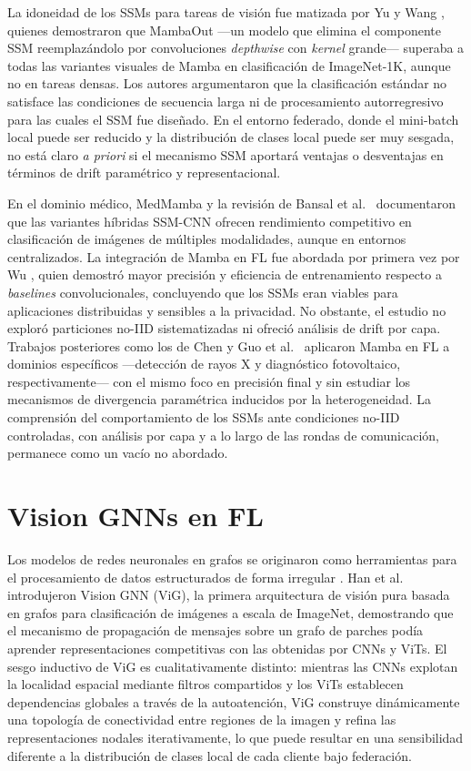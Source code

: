 La idoneidad de los SSMs para tareas de visión fue matizada por Yu y Wang \cite{yu2025mambaout},
quienes demostraron que MambaOut ---un modelo que elimina el componente SSM reemplazándolo por
convoluciones \textit{depthwise} con \textit{kernel} grande--- superaba a todas las variantes
visuales de Mamba en clasificación de ImageNet-1K, aunque no en tareas densas.
Los autores argumentaron que la clasificación estándar no satisface las condiciones de secuencia
larga ni de procesamiento autorregresivo para las cuales el SSM fue diseñado.
En el entorno federado, donde el mini-batch local puede ser reducido y la distribución de clases
local puede ser muy sesgada, no está claro \textit{a priori} si el mecanismo SSM aportará ventajas
o desventajas en términos de drift paramétrico y representacional.

En el dominio médico, MedMamba \cite{yue2024medmamba} y la revisión de Bansal et al.\
\cite{bansal2024comprehensive} documentaron que las variantes híbridas SSM-CNN ofrecen rendimiento
competitivo en clasificación de imágenes de múltiples modalidades, aunque en entornos centralizados.
La integración de Mamba en FL fue abordada por primera vez por Wu \cite{wu2024mamba}, quien
demostró mayor precisión y eficiencia de entrenamiento respecto a \textit{baselines} convolucionales,
concluyendo que los SSMs eran viables para aplicaciones distribuidas y sensibles a la privacidad.
No obstante, el estudio no exploró particiones no-IID sistematizadas ni ofreció análisis de drift
por capa.
Trabajos posteriores como los de Chen \cite{chen2024mamaba} y Guo et al.\ \cite{guo2026mamba}
aplicaron Mamba en FL a dominios específicos ---detección de rayos X y diagnóstico fotovoltaico,
respectivamente--- con el mismo foco en precisión final y sin estudiar los mecanismos de divergencia
paramétrica inducidos por la heterogeneidad.
La comprensión del comportamiento de los SSMs ante condiciones no-IID controladas, con análisis
por capa y a lo largo de las rondas de comunicación, permanece como un vacío no abordado.


\section{Vision GNNs en FL}

Los modelos de redes neuronales en grafos se originaron como herramientas para el procesamiento
de datos estructurados de forma irregular \cite{Gori2005ANM, Scarselli:2009ku}.
Han et al.\ \cite{han2022vision} introdujeron Vision GNN (ViG), la primera arquitectura de visión
pura basada en grafos para clasificación de imágenes a escala de ImageNet, demostrando que el
mecanismo de propagación de mensajes sobre un grafo de parches podía aprender representaciones
competitivas con las obtenidas por CNNs y ViTs.
El sesgo inductivo de ViG es cualitativamente distinto: mientras las CNNs explotan la localidad
espacial mediante filtros compartidos y los ViTs establecen dependencias globales a través de la
autoatención, ViG construye dinámicamente una topología de conectividad entre regiones de la imagen
y refina las representaciones nodales iterativamente, lo que puede resultar en una sensibilidad
diferente a la distribución de clases local de cada cliente bajo federación.

